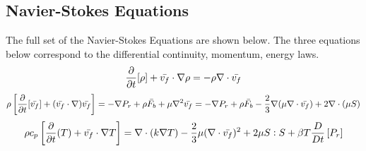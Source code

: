 \documentclass[class=report, 12pt, crop=false]{standalone}
\begin{document}
\begin{center}
\chapter{Navier-Stokes Equations}
\begin{comment}
\end{comment}
The full set of the Navier-Stokes Equations are shown below. The three equations below correspond to the differential continuity, momentum, energy laws.
$$\frac{\partial}{\partial t}[\rho] + \bar{v_f} \cdot \nabla\rho = -\rho \nabla \cdot \bar{v_f}$$
$$\rho \left[\frac{\partial}{\partial t}[\bar{v_f}] + (\bar{v_f} \cdot \nabla) \bar{v_f}\right] = -\nabla P_r + \rho \bar{F_b} + \mu\nabla^2\bar{v_f} = -\nabla P_r + \rho \bar{F_b} - \frac{2}{3}\nabla(\mu\nabla\cdot \bar{v_f}) + 2\nabla\cdot(\mu S)$$
$$\rho c_p\left[\frac{\partial}{\partial t}(T) + \bar{v_f}\cdot\nabla T \right] = \nabla\cdot(k\nabla T) - \frac{2}{3}\mu(\nabla\cdot \bar{v_f})^2 + 2\mu S:S + \beta T \frac{D}{Dt}\left[P_r\right]$$
\end{center}
\end{document}
